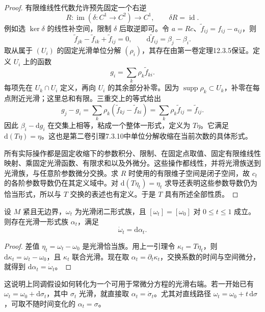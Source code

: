 \begin{proof}
	有限维线性代数允许预先固定一个右逆
	\[
		R:\operatorname{im}(\delta:C^1\to C^2)\longrightarrow C^1,
		\qquad \delta R=\operatorname{id}.
	\]
	例如选 \(\ker\delta\) 的线性补空间，限制 \(\delta\) 后取逆即可。令 \(a=Rc\)、\(\widetilde f_{ij}=f_{ij}-a_{ij}\)，则
	\[
		\widetilde f_{jk}-\widetilde f_{ik}+\widetilde f_{ij}=0,
		\qquad \mathrm{d}\widetilde f_{ij}=\beta_j-\beta_i.
	\]
	取从属于 \((U_i)\) 的固定光滑单位分解 \((\rho_i)\)，其存在由第一卷定理12.3.5保证。定义 \(U_i\) 上的函数
	\[
		g_i=\sum_k\rho_k\widetilde f_{ki}.
	\]
	每项先在 \(U_k\cap U_i\) 定义，再向 \(U_i\) 的其余部分补零。因为 \(\operatorname{supp}\rho_k\subset U_k\)，补零在每点附近光滑；这里总和有限。三重交上的等式给出
	\[
		g_j-g_i=\sum_k\rho_k(\widetilde f_{kj}-\widetilde f_{ki})
		=\sum_k\rho_k\widetilde f_{ij}=\widetilde f_{ij}.
	\]
	因此 \(\beta_i-\mathrm{d}g_i\) 在交集上相等，粘成一个整体一形式，定义为 \(T\eta\)。它满足 \(\mathrm{d}(T\eta)=\eta\)。这也是第二卷引理7.3.10中单位分解收缩在当前次数的具体形式。

	所有实际操作都是固定收缩下的参数积分、限制、在固定点取值、固定有限维线性映射、乘固定光滑函数、有限求和以及外微分。这些操作都线性，并将光滑族送到光滑族，与任意阶参数微分交换。求 \(R\) 时使用的有限维子空间是闭子空间，故 \(c_t\) 的各阶参数导数仍在其定义域中。对 \(\mathrm{d}(T\eta_t)=\eta_t\) 求导还表明这些参数导数仍为恰当形式，所以与 \(T\) 交换的表述也有定义。于是 \(T\) 具有所述全部性质。
\end{proof}

\begin{corollary}\label{g4:cor:0801:constant-class-derivative}
	设 \(M\) 紧且无边界，\(\omega_t\) 为光滑闭二形式族，且 \([\omega_t]=[\omega_0]\) 对 \(0\le t\le1\) 成立。则存在光滑一形式族 \(\alpha_t\)，满足
	\begin{equation}\label{g4:eq:0801:primitive-derivative}
		\dot\omega_t=\mathrm{d}\alpha_t.
	\end{equation}
\end{corollary}
\begin{proof}
	差值 \(\eta_t=\omega_t-\omega_0\) 是光滑恰当族。用上一引理令 \(\kappa_t=T\eta_t\)，则 \(\mathrm{d}\kappa_t=\omega_t-\omega_0\)，且 \(\kappa_t\) 联合光滑。现在取 \(\alpha_t=\partial_t\kappa_t\)，交换系数的时间与空间微分，就得到 \(\mathrm{d}\alpha_t=\dot\omega_t\)。
\end{proof}

这说明上同调假设如何转化为一个可用于常微分方程的光滑右端。若一开始已有 \(\omega_t=\omega_0+\mathrm{d}\sigma_t\)，其中 \(\sigma_t\) 光滑，就直接取 \(\alpha_t=\dot\sigma_t\)。尤其对直线路径 \(\omega_t=\omega_0+t\,\mathrm{d}\sigma\)，可取不随时间变化的 \(\alpha_t=\sigma\)。

